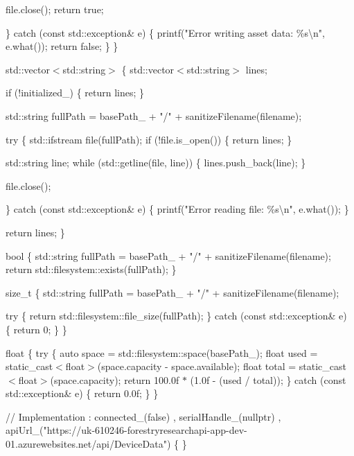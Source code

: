 file.\+close(); return true;

\} catch (const std\+::exception\& e) \{ printf("{}\+Error writing asset data\+: \%s\textbackslash{}n"{}, e.\+what()); return false; \} \}

std\+::vector$<$std\+::string$>$  \{ std\+::vector$<$std\+::string$>$ lines;

if (!initialized\+\_\+) \{ return lines; \}

std\+::string full\+Path = base\+Path\+\_\+ + "{}/"{} + sanitize\+Filename(filename);

try \{ std\+::ifstream file(full\+Path); if (!file.is\+\_\+open()) \{ return lines; \}

std\+::string line; while (std\+::getline(file, line)) \{ lines.\+push\+\_\+back(line); \}

file.\+close();

\} catch (const std\+::exception\& e) \{ printf("{}\+Error reading file\+: \%s\textbackslash{}n"{}, e.\+what()); \}

return lines; \}

bool  \{ std\+::string full\+Path = base\+Path\+\_\+ + "{}/"{} + sanitize\+Filename(filename); return std\+::filesystem\+::exists(full\+Path); \}

size\+\_\+t  \{ std\+::string full\+Path = base\+Path\+\_\+ + "{}/"{} + sanitize\+Filename(filename);

try \{ return std\+::filesystem\+::file\+\_\+size(full\+Path); \} catch (const std\+::exception\& e) \{ return 0; \} \}

float  \{ try \{ auto space = std\+::filesystem\+::space(base\+Path\+\_\+); float used = static\+\_\+cast$<$float$>$(space.\+capacity -\/ space.\+available); float total = static\+\_\+cast$<$float$>$(space.\+capacity); return 100.\+0f \texorpdfstring{$\ast$}{*} (1.\+0f -\/ (used / total)); \} catch (const std\+::exception\& e) \{ return 0.\+0f; \} \}

//  Implementation  \+: connected\+\_\+(false) , serial\+Handle\+\_\+(nullptr) , api\+Url\+\_\+("{}https\+://uk-\/610246-\/forestryresearchapi-\/app-\/dev-\/01.\+azurewebsites.\+net/api/\+Device\+Data"{}) \{ \}

